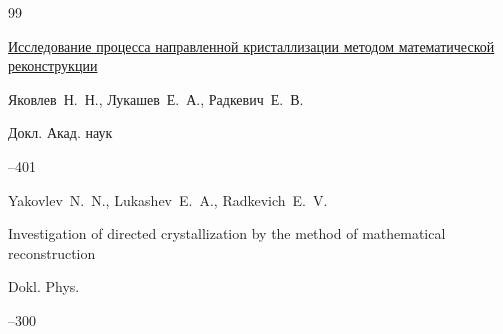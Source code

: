 \begin{thebibliography}{99}














\paper \href{https://elibrary.ru/item.asp?id=17858912}{Исследование процесса направленной кристаллизации методом математической реконструкции}

\by Яковлев~Н.~Н., Лукашев~Е.~А., Радкевич~Е.~В.

\jour Докл. Акад. наук




--401

\transl

\by Yakovlev~N.~N.,  Lukashev~E.~A., Radkevich~E.~V.

\paper Investigation of directed crystallization by the method of mathematical reconstruction

\jour Dokl. Phys.




--300









\end{thebibliography}
